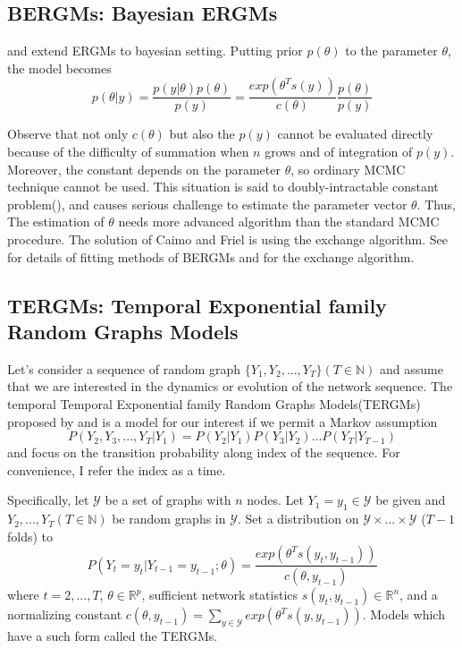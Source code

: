 \documentclass[aspectratio=169,ignorenonframetext,9pt]{beamer}
\theoremstyle{plain}
\theoremstyle{definition}
\begin{document}
\subsection{BERGMs: Bayesian ERGMs}
\cite{RN115} and \cite{RN116} extend ERGMs to bayesian setting. Putting prior $p(\theta)$ to the parameter $\theta$, the model becomes
\[p(\theta|y)=\frac{p(y|\theta)p(\theta)}{p(y)}=\frac{exp(\theta^T s(y))}{c(\theta)}\frac{p(\theta)}{p(y)}\]

Observe that not only $c(\theta)$ but also the $p(y)$ cannot be evaluated directly
because of the difficulty of summation when $n$ grows and of integration of $p(y)$.
Moreover, the constant depends on the parameter $\theta$, so ordinary MCMC technique cannot be used.
This situation is said to doubly-intractable constant problem(\cite{RN119}), and causes serious challenge to estimate the parameter vector $\theta$.
Thus, The estimation of $\theta$ needs more advanced algorithm than the standard MCMC procedure.
The solution of Caimo and Friel is using the exchange algorithm. See \cite{RN115} for details of fitting methods of BERGMs
and \cite{RN127} for the exchange algorithm.


\subsection{TERGMs: Temporal Exponential family Random Graphs Models}
Let's consider a sequence of random graph $\{Y_1, Y_2, ..., Y_T\} (T\in\mathbb{N})$ and assume that
we are interested in the dynamics or evolution of the network sequence.
The temporal Temporal Exponential family Random Graphs Models(TERGMs)
proposed by \cite{RN125} and \cite{RN126}
is a model for our interest if we permit a Markov assumption
\[P(Y_2,Y_3,...,Y_T|Y_1)=P(Y_2|Y_1)P(Y_3|Y_2)...P(Y_T|Y_{T-1})\]
and focus on the transition probability along index of the sequence.
For convenience, I refer the index as a time.

Specifically, let $\mathcal{Y}$ be a set of graphs with $n$ nodes. 
Let $Y_1=y_1 \in \mathcal{Y}$ be given and $Y_2,...,Y_T (T\in\mathbb{N})$ be random graphs in $\mathcal{Y}$.
Set a distribution on $\mathcal{Y}\times ... \times \mathcal{Y}$ ($T-1$ folds) to
\[P(Y_t=y_t|Y_{t-1}=y_{t-1};\theta) = \frac{exp(\theta^{T}s(y_t, y_{t-1}))}{c(\theta, y_{t-1})}\]
where $t=2,...,T$, $\theta\in\mathbb{R}^p$,
sufficient network statistics $s(y_t, y_{t-1})\in\mathbb{R}^n$,
and a normalizing constant $c(\theta, y_{t-1})=\sum_{y\in\mathcal{Y}}exp(\theta^{T}s(y, y_{t-1}))$.
Models which have a such form called the TERGMs.
\end{document}
